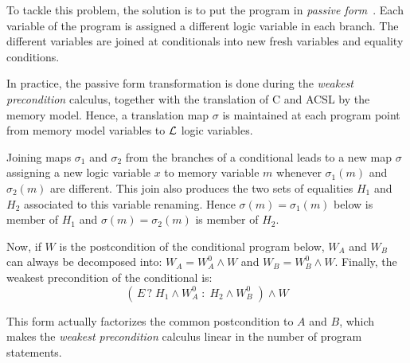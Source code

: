 To tackle this problem, the solution is to put the program in
\emph{passive form}~\cite{FlanaganSaxe2001,Leino2003}. Each variable
of the program is assigned a different logic variable in each
branch. The different variables are joined at conditionals into new
fresh variables and equality conditions.

In practice, the passive form transformation is done during the
\emph{weakest precondition} calculus, together with the translation of
\textsf{C} and \textsf{ACSL} by the memory model. Hence, a translation
map $\sigma$ is maintained at each program point from memory model
variables to $\cal{L}$ logic variables.

Joining maps $\sigma_1$ and $\sigma_2$ from the branches of a
conditional leads to a new map $\sigma$ assigning a new logic variable
$x$ to memory variable $m$ whenever $\sigma_1(m)$ and $\sigma_2(m)$
are different. This join also produces the two sets of equalities $H_1$
and $H_2$ associated to this variable renaming. Hence $\sigma(m)=\sigma_1(m)$ below
is member of $H_1$ and $\sigma(m)=\sigma_2(m)$ is member of $H_2$.

Now, if $W$ is the postcondition of the conditional program below,
$W_A$ and $W_B$ can always be decomposed into: $W_A=W^0_A\wedge W$ and
$W_B=W^0_B\wedge W$. Finally, the weakest precondition of the
conditional is:
\[ (\,E \, ?\; H_1\wedge W^0_A \;:\; H_2\wedge W^0_B\;) \wedge W \]

This form actually factorizes the common postcondition to $A$ and $B$,
which makes the \emph{weakest precondition} calculus linear in the
number of program statements.
